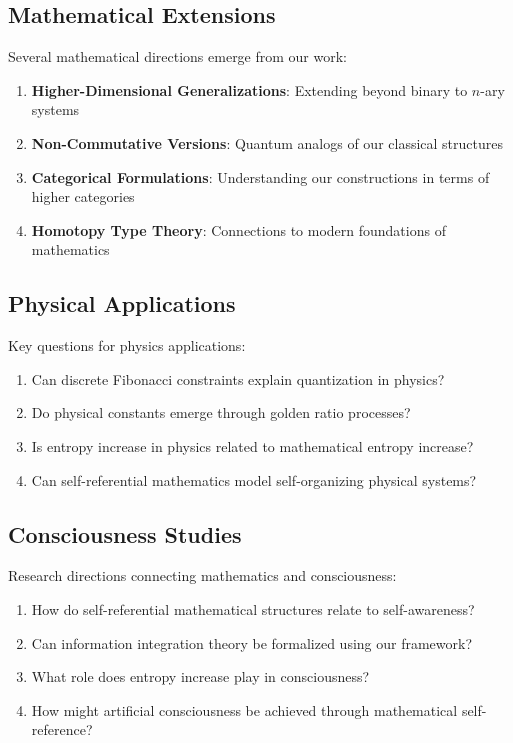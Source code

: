 \documentclass[12pt]{article}
\theoremstyle{plain}
\theoremstyle{definition}
\begin{document}
\subsection{Mathematical Extensions}

Several mathematical directions emerge from our work:

\begin{enumerate}
\item \textbf{Higher-Dimensional Generalizations}: Extending beyond binary to $n$-ary systems
\item \textbf{Non-Commutative Versions}: Quantum analogs of our classical structures
\item \textbf{Categorical Formulations}: Understanding our constructions in terms of higher categories
\item \textbf{Homotopy Type Theory}: Connections to modern foundations of mathematics
\end{enumerate}

\subsection{Physical Applications}

Key questions for physics applications:

\begin{enumerate}
\item Can discrete Fibonacci constraints explain quantization in physics?
\item Do physical constants emerge through golden ratio processes?
\item Is entropy increase in physics related to mathematical entropy increase?
\item Can self-referential mathematics model self-organizing physical systems?
\end{enumerate}

\subsection{Consciousness Studies}

Research directions connecting mathematics and consciousness:

\begin{enumerate}
\item How do self-referential mathematical structures relate to self-awareness?
\item Can information integration theory be formalized using our framework?
\item What role does entropy increase play in consciousness?
\item How might artificial consciousness be achieved through mathematical self-reference?
\end{enumerate}
\end{document}
